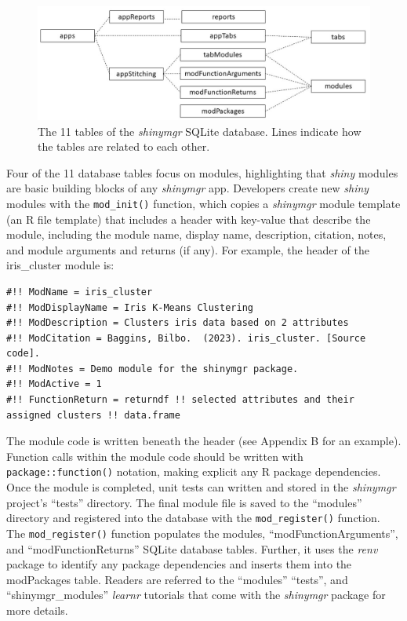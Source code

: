 \begin{figure}[b]
\includegraphics[width=1\linewidth]{images/figure4} \caption{The 11 tables of the \textit{shinymgr} SQLite database. Lines indicate how the tables are related to each other.}\label{fig:fig4}
\end{figure}

Four of the 11 database tables focus on modules, highlighting that \emph{shiny} modules are basic building blocks of any \emph{shinymgr} app. Developers create new \emph{shiny} modules with the \texttt{mod\_init()} function, which copies a \emph{shinymgr} module template (an R file template) that includes a header with key-value that describe the module, including the module name, display name, description, citation, notes, and module arguments and returns (if any). For example, the header of the iris\_cluster module is:

\begin{verbatim}
#!! ModName = iris_cluster
#!! ModDisplayName = Iris K-Means Clustering
#!! ModDescription = Clusters iris data based on 2 attributes
#!! ModCitation = Baggins, Bilbo.  (2023). iris_cluster. [Source code].
#!! ModNotes = Demo module for the shinymgr package.
#!! ModActive = 1
#!! FunctionReturn = returndf !! selected attributes and their assigned clusters !! data.frame
\end{verbatim}

The module code is written beneath the header (see Appendix B for an example). Function calls within the module code should be written with \texttt{package::function()} notation, making explicit any R package dependencies. Once the module is completed, unit tests can written and stored in the \emph{shinymgr} project's ``tests'' directory. The final module file is saved to the ``modules'' directory and registered into the database with the \texttt{mod\_register()} function. The \texttt{mod\_register()} function populates the modules, ``modFunctionArguments'', and ``modFunctionReturns'' SQLite database tables. Further, it uses the \emph{renv} package to identify any package dependencies and inserts them into the modPackages table. Readers are referred to the ``modules'' ``tests'', and ``shinymgr\_modules'' \emph{learnr} tutorials that come with the \emph{shinymgr} package for more details.

